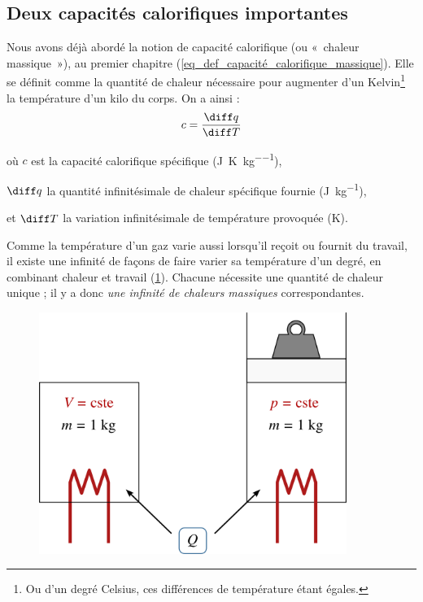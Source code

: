 	\subsection{Deux capacités calorifiques importantes}

		Nous avons déjà abordé la notion de capacité calorifique (ou «~chaleur massique~»), au premier chapitre (\ref{eq_def_capacité_calorifique_massique}). Elle se définit comme la quantité de chaleur nécessaire pour augmenter d’un Kelvin\footnote{Ou d’un degré Celsius, ces différences de température étant égales.}
		la température d’un kilo du corps. On a ainsi :
		\begin{equation}
			c = \frac{\diff q}{\diff T}
		\end{equation}
		\begin{equationterms}
			\item où \tab $c$ 		\tab\tab est la capacité calorifique spécifique (\si{\joule\per\kelvin\per\kilogram}),
			\item 	\tab $\diff q$ \tab la quantité infinitésimale de chaleur spécifique fournie (\si{\joule\per\kilogram}),
			\item et \tab $\diff T$ \tab la variation infinitésimale de température provoquée (\si{\kelvin}).
		\end{equationterms}

		Comme la température d’un gaz varie aussi lorsqu’il reçoit ou fournit du travail, il existe une infinité de façons de faire varier sa température d’un degré, en combinant chaleur et travail (\cref{fig_expérience_diff_chaleurs_massiques}). Chacune nécessite une quantité de chaleur unique ; il y a donc \textit{une infinité de chaleurs massiques} correspondantes.

		\begin{figure}
			\begin{center}
				\includegraphics[width=10cm]{images/difference_capacites_calorifiques.png}
			\end{center}
			\label{fig_expérience_diff_chaleurs_massiques}
		\end{figure}

